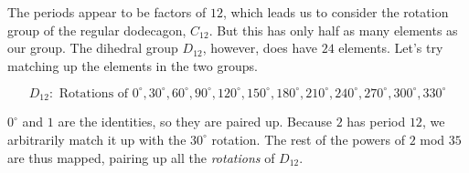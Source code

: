 \documentclass[../gatm.tex]{subfiles}
\begin{document}
The periods appear to be factors of $12$, which leads us to consider the rotation group of the regular dodecagon, $C_{12}$. But this has only half as many elements as our group. The dihedral group $D_{12}$, however, does have $24$ elements. Let's try matching up the elements in the two groups.

$$D_{12}:\text{ Rotations of } 0^\circ, 30^\circ, 60^\circ, 90^\circ, 120^\circ, 150^\circ, 180^\circ, 210^\circ, 240^\circ, 270^\circ, 300^\circ, 330^\circ$$

\noindent$0^\circ$ and $1$ are the identities, so they are paired up. Because $2$ has period $12$, we arbitrarily match it up with the $30^\circ$ rotation. The rest of the powers of $2$ mod $35$ are thus mapped, pairing up all the \textit{rotations} of $D_{12}$.

\pagebreak
\end{document}
